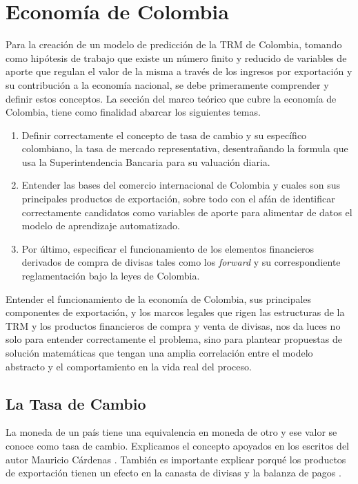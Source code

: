 \section{Economía de Colombia}
Para la creación de un modelo de predicción de la TRM de Colombia, tomando como hipótesis de trabajo que existe un número finito y reducido de variables de aporte que regulan el valor de la misma a través de los ingresos por exportación y su contribución a la economía nacional, se debe primeramente comprender y definir estos conceptos. La sección del marco teórico que cubre la economía de Colombia, tiene como finalidad abarcar los siguientes temas. 

\begin{enumerate}
	\item Definir correctamente el concepto de tasa de cambio y su específico colombiano, la tasa de mercado representativa, desentrañando la formula que usa la Superintendencia Bancaria para su valuación diaria.
	\item Entender las bases del comercio internacional de Colombia y cuales son sus principales productos de exportación, sobre todo con el afán de identificar correctamente candidatos como variables de aporte para alimentar de datos el modelo de aprendizaje automatizado. 
	\item Por último, especificar el funcionamiento de los elementos financieros derivados de compra de divisas tales como los \emph{forward} y su correspondiente reglamentación bajo la leyes de Colombia. 
\end{enumerate}

Entender el funcionamiento de la economía de Colombia, sus principales componentes de exportación, y los marcos legales que rigen las estructuras de la TRM y los productos financieros de compra y venta de divisas, nos da luces no solo para entender correctamente el problema, sino para plantear propuestas de solución matemáticas que tengan una amplia correlación entre el modelo abstracto y el comportamiento en la vida real del proceso. 

\subsection{La Tasa de Cambio}
La moneda de un país tiene una equivalencia en moneda de otro y ese valor se conoce como tasa de cambio. Explicamos el concepto apoyados en los escritos del autor Mauricio Cárdenas \cite{cardenas}. También es importante explicar porqué los productos de exportación tienen un efecto en la canasta de divisas y la balanza de pagos \cite{crisisCambiarias}.   

